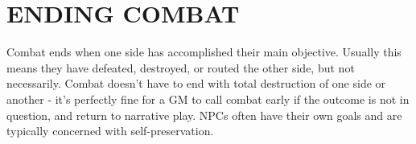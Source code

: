 \section{ENDING COMBAT}
Combat ends when one side has accomplished their main objective. Usually this means they have defeated, destroyed, or routed the other side, but not necessarily. Combat doesn’t have to end with total destruction of one side or another - it’s perfectly fine for a GM to call combat early if the outcome is not in question, and return to narrative play. NPCs often have their own goals and are typically concerned with self-preservation. 